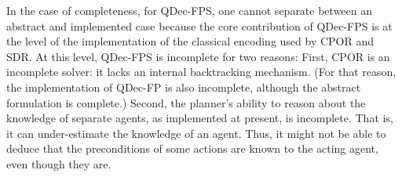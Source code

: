 \documentclass[letterpaper]{article} %
\theoremstyle{definition}
\begin{document}
In the case of completeness, for QDec-FPS, one cannot
separate between an abstract and implemented case because the core contribution of QDec-FPS is at the level of
the implementation of the classical encoding used by CPOR and SDR. At this level, QDec-FPS is incomplete for two
reasons: First, CPOR is an incomplete solver: it lacks an internal backtracking mechanism. (For that reason, the implementation of QDec-FP is also incomplete, although the abstract formulation is complete.)
Second, the planner's ability to reason about the knowledge of separate agents, as implemented at present, is incomplete. That is, it can under-estimate the knowledge of an agent. Thus, it might not be able to deduce that the preconditions of some actions are known to the acting agent, even though they are. 



\end{document}
